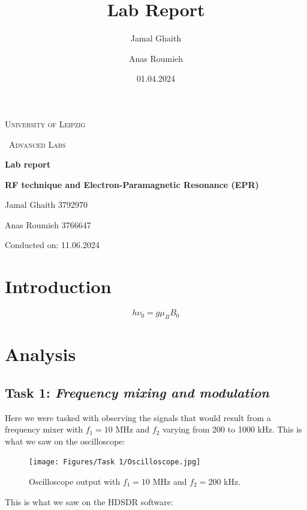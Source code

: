 \documentclass{article}
\title{Lab Report}
\author{Jamal Ghaith}
\author{Anas Roumieh}
\date{01.04.2024}
\begin{document}
\begin{titlepage}
	\centering
	{\scshape\LARGE University of Leipzig \par}
	\vspace{1cm}
	{\scshape\ Advanced Labs\par}
	\vspace{1.5cm}
	{\huge\bfseries Lab report\par}
	\vspace{2cm}
	{\huge\bfseries RF technique and Electron-Paramagnetic Resonance (EPR)\par}
	\vspace{2cm}
	{\Large Jamal Ghaith 3792970\par}
    {\Large Anas Roumieh 3766647\par}
	\vfill

    {\Large Conducted on: 11.06.2024 \par}
	\vfill
\end{titlepage}


\tableofcontents
{}
\pagebreak{}

\section{Introduction}
\begin{equation}
	h {\nu}_0 = g \mu_B B_0
	\label{eq:resonancecondition}
\end{equation}
\pagebreak{}

\section{Analysis}

\subsection{Task 1: \textit{Frequency mixing and modulation}}

Here we were tasked with observing the signals that would result from a frequency mixer with $f_1 = 10$ MHz and $f_2$ varying from 200 to 1000 kHz. This is what we saw on the oscilloscope:

\begin{figure}[h]
	\centering
	\texttt{[image: Figures/Task 1/Oscilloscope.jpg]}
	\caption{Oscilloscope output with $f_1 = 10$ MHz and $f_2 = 200$ kHz.}
	\label{fig:oscilloscope}
\end{figure}

This is what we saw on the HDSDR software:
\end{document}

